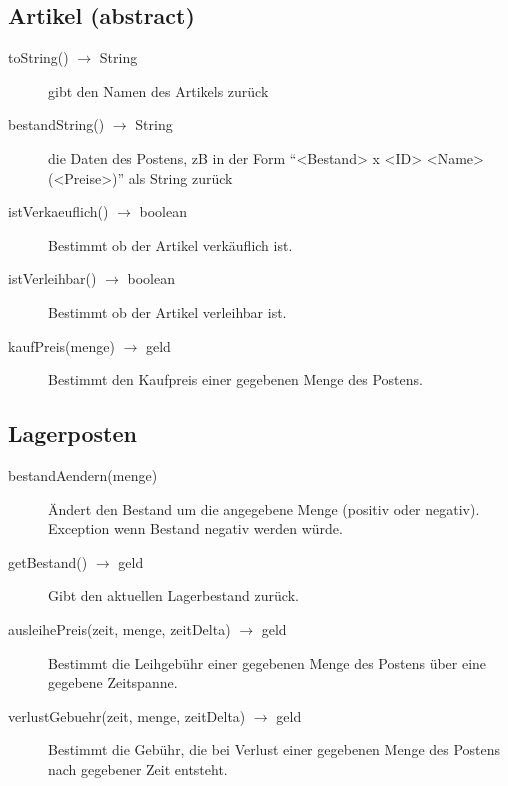\documentclass[a4paper,12pt,titlepage]{article}
\begin{document}
\subsection{Artikel (abstract)}
\begin{description}
\item[toString() $\rightarrow$ String]
gibt den Namen des Artikels zurück
\item[bestandString() $\rightarrow$ String]
die Daten des Postens, zB in der Form \enquote{<Bestand> x <ID> <Name> (<Preise>)} als String zurück
\item[istVerkaeuflich() $\rightarrow$ boolean]
Bestimmt ob der Artikel verkäuflich ist.
\item[istVerleihbar() $\rightarrow$ boolean]
Bestimmt ob der Artikel verleihbar ist.
\item[kaufPreis(menge) $\rightarrow$ geld]
Bestimmt den Kaufpreis einer gegebenen Menge des Postens.
\end{description}
\subsection{Lagerposten}
\begin{description}
\item[bestandAendern(menge)]
Ändert den Bestand um die angegebene Menge (positiv oder negativ). \\
Exception wenn Bestand negativ werden würde.
\item[getBestand() $\rightarrow$ geld]
Gibt den aktuellen Lagerbestand zurück.
\item[ausleihePreis(zeit, menge, zeitDelta) $\rightarrow$ geld]
Bestimmt die Leihgebühr einer gegebenen Menge des Postens über eine gegebene Zeitspanne.
\item[verlustGebuehr(zeit, menge, zeitDelta) $\rightarrow$ geld]
Bestimmt die Gebühr, die bei Verlust einer gegebenen Menge des Postens nach gegebener Zeit entsteht.

\end{description}
\end{document}
